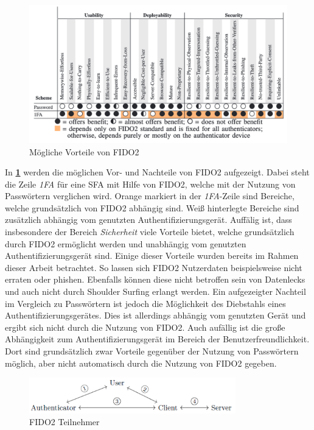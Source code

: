 \begin{figure}[h]
	\centering 
	\includegraphics[width=1\textwidth]{img/abbildungen/fido2_usability.png}
	\captionsetup{format=hang}
	\caption{Mögliche Vorteile von FIDO2} \label{fido2-pros}
\end{figure}

In \textbf{\ref{fido2-pros}} werden die möglichen Vor- und Nachteile von \ac{FIDO}2 aufgezeigt. Dabei steht die Zeile \textit{1FA} für eine \ac{SFA} mit Hilfe von \ac{FIDO}2, welche mit der Nutzung von Passwörtern verglichen wird. Orange markiert in der \textit{1FA}-Zeile sind Bereiche, welche grundsätzlich von \ac{FIDO}2 abhängig sind. Weiß hinterlegte Bereiche sind zusätzlich abhängig vom genutzten Authentifizierungsgerät. Auffälig ist, dass insbesondere der Bereich \textit{Sicherheit} viele Vorteile bietet, welche grundsätzlich durch \ac{FIDO}2 ermöglicht werden und unabhängig vom genutzten Authentifizierungsgerät sind. Einige dieser Vorteile wurden bereits im Rahmen dieser Arbeit betrachtet. So lassen sich \ac{FIDO}2 Nutzerdaten beispielsweise nicht erraten oder phishen. Ebenfalls können diese nicht betroffen sein von Datenlecks und auch nicht durch Shoulder Surfing erlangt werden. Ein aufgezeigter Nachteil im Vergleich zu Passwörtern ist jedoch die Möglichkeit des Diebstahls eines Authentifizierungsgerätes. Dies ist allerdings abhängig vom genutzten Gerät und ergibt sich nicht durch die Nutzung von \ac{FIDO}2. Auch aufällig ist die große Abhängigkeit zum Authentifizierungsgerät im Bereich der Benutzerfreundlichkeit. Dort sind grundsätzlich zwar Vorteile gegenüber der Nutzung von Passwörtern möglich, aber nicht automatisch durch die Nutzung von \ac{FIDO}2 gegeben. 

\begin{figure}[h]
	\centering 
	\includegraphics[width=0.8\textwidth]{img/abbildungen/fido2_com.png}
	\captionsetup{format=hang}
	\caption{FIDO2 Teilnehmer} \label{fido2-channels}
\end{figure}

